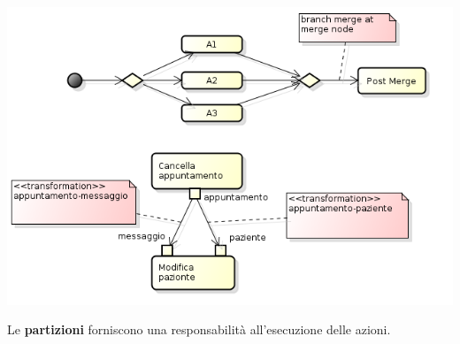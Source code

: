 \begin{center}

\includegraphics[width=0.75\columnwidth]{img7} %

\end{center}

Le \textbf{partizioni} forniscono una responsabilità all'esecuzione delle azioni.

